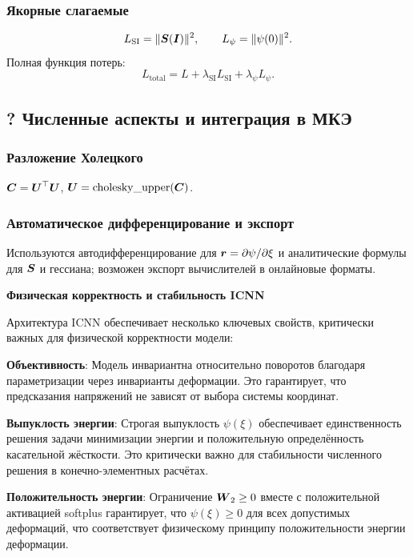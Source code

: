 \subsubsection{Якорные слагаемые}
\begin{equation}
 L_{\text{SI}} = \lVert \boldsymbol{S}(\boldsymbol{I})\rVert^2,\qquad L_{\psi}=\lVert\psi(0)\rVert^2.
\end{equation}
Полная функция потерь:
\begin{equation}
 L_{\text{total}} = L + \lambda_{\text{SI}} L_{\text{SI}} + \lambda_{\psi} L_{\psi}.
\end{equation}

\subsection{? Численные аспекты и интеграция в МКЭ}
\subsubsection{Разложение Холецкого}
\(\boldsymbol{C} = \boldsymbol{U}^{\top}\boldsymbol{U}\), \; \(\boldsymbol{U}=\operatorname{cholesky\_upper}(\boldsymbol{C})\).

\subsubsection{Автоматическое дифференцирование и экспорт}
Используются автодифференцирование для \(\boldsymbol{r}=\partial\psi/\partial\xi\) и аналитические формулы для \(\boldsymbol{S}\) и гессиана; возможен экспорт вычислителей в онлайновые форматы.

\textbf{Физическая корректность и стабильность ICNN}

Архитектура ICNN обеспечивает несколько ключевых свойств, критически важных для физической корректности модели:

\textbf{Объективность}: Модель инвариантна относительно поворотов благодаря параметризации через инварианты деформации. Это гарантирует, что предсказания напряжений не зависят от выбора системы координат.

\textbf{Выпуклость энергии}: Строгая выпуклость \(\psi(\xi)\) обеспечивает единственность решения задачи минимизации энергии и положительную определённость касательной жёсткости. Это критически важно для стабильности численного решения в конечно-элементных расчётах.

\textbf{Положительность энергии}: Ограничение \(\boldsymbol{W}_2 \geq 0\) вместе с положительной активацией softplus гарантирует, что \(\psi(\xi) \geq 0\) для всех допустимых деформаций, что соответствует физическому принципу положительности энергии деформации.

